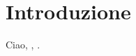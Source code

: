 \clearpage{\pagestyle{empty}\cleardoublepage}
\chapter*{Introduzione} 

Ciao, \cite{photon2010}, \cite{gse2010}.

